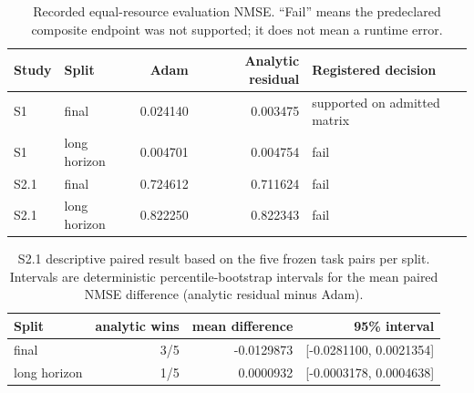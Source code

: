 \begin{table}[t]
\centering
\caption{Recorded equal-resource evaluation NMSE.  ``Fail'' means the predeclared composite endpoint was not supported; it does not mean a runtime error.}
\begin{tabular}{llrrl}
\toprule
Study & Split & Adam & Analytic residual & Registered decision \\
\midrule
S1 & final & 0.024140 & 0.003475 & supported on admitted matrix \\
S1 & long horizon & 0.004701 & 0.004754 & fail \\
S2.1 & final & 0.724612 & 0.711624 & fail \\
S2.1 & long horizon & 0.822250 & 0.822343 & fail \\
\bottomrule
\end{tabular}
\label{tab:primary-results}
\end{table}

\begin{table}[t]
\centering
\caption{S2.1 descriptive paired result based on the five frozen task pairs per split.  Intervals are deterministic percentile-bootstrap intervals for the mean paired NMSE difference (analytic residual minus Adam).}
\begin{tabular}{lrrr}
\toprule
Split & analytic wins & mean difference & 95\% interval \\
\midrule
final & 3/5 & -0.0129873 & [-0.0281100, 0.0021354] \\
long horizon & 1/5 & 0.0000932 & [-0.0003178, 0.0004638] \\
\bottomrule
\end{tabular}
\label{tab:s21-paired}
\end{table}
